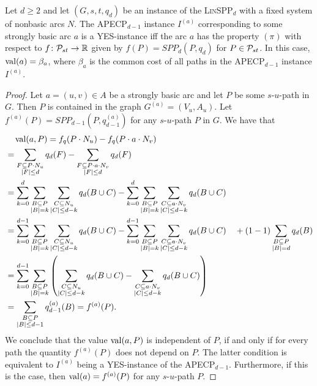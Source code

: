 \begin{lemma}
\label{lemma:corresponding-instance}
Let $d \geq 2$ and let  $(G, s,t, q_d)$ be an instance of the \textsc{Lin}SPP$_d$ with a fixed system of nonbasic arcs  $N$. 
The APECP$_{d-1}$ instance $I^{(a)}$ corresponding to some strongly basic arc $a$ is a \textsc{YES}-instance iff the arc $a$ has the property $(\pi)$ with respect to $f\colon \mathcal{P}_{st}\to\mathbb{R}$ given by $f(P)=SPP_d(P,q_d)$ for $P\in \mathcal{P}_{st}$. In this case, $\operatorname{val}(a) = \beta_a$, where $\beta_a$ is the common cost of all paths in the APECP$_{d-1}$ instance $I^{(a)}$.
\end{lemma}
\begin{proof}
Let $a = (u,v) \in A$ be a strongly basic arc and let $P$ be some $s$-$u$-path in $G$. Then $P$ is  contained in the graph $G^{(a)} = (V_u, A_u)$. 
Let $f^{(a)}(P)=SPP_{d-1}(P,q^{(a)}_{d-1})$ for any $s$-$u$-path $P$ in $G$. We have that
\begin{align*}
    &\quad \operatorname{val}(a, P) = f_q(P \cdot N_u) - f_q(P \cdot a \cdot N_v) \\
    &= \sum_{\substack{F \subseteq P \cdot N_u\\ |F| \leq d}}q_d(F) - \sum_{\substack{F \subseteq P \cdot a \cdot N_v\\ |F| \leq d}}q_d(F)\\
    &= \sum_{k=0}^d \sum_{\substack{B \subseteq P\\ |B| = k}}\sum_{\substack{C \subseteq N_u\\ |C| \leq d - k}}q_d(B \cup C) - \sum_{k=0}^d \sum_{\substack{B \subseteq P\\ |B| = k}}\sum_{\substack{C \subseteq a \cdot N_v\\ |C| \leq d - k}}q_d(B \cup C)\\
    &= \sum_{k=0}^{d-1} \sum_{\substack{B \subseteq P\\ |B| = k}}\sum_{\substack{C \subseteq N_u\\ |C| \leq d - k}}q_d(B \cup C) - \sum_{k=0}^{d-1} \sum_{\substack{B \subseteq P\\ |B| = k}}\sum_{\substack{C \subseteq a \cdot N_v\\ |C| \leq d - k}}q_d(B \cup C) \quad +  (1 - 1)\sum_{\substack{B \subseteq P\\ |B| = d}}q_d(B)\\
     &= \sum_{k=0}^{d-1} \sum_{\substack{B \subseteq P\\ |B| = k}}\left(\sum_{\substack{C \subseteq N_u\\ |C| \leq d - k}}q_d(B \cup C) - \sum_{\substack{C \subseteq a \cdot N_v\\ |C| \leq d - k}}q_d(B \cup C)
     \right)\\
     &= \sum_{\substack{B \subseteq P\\ |B| \leq d-1}}q^{(a)}_{d-1}(B) = f^{(a)}(P).
\end{align*}
We conclude that the value $\operatorname{val}(a, P)$ is independent of $P$, if and only if for every path the quantity $f^{(a)}(P)$ does not depend on $P$. The latter condition is equivalent to  $I^{(a)}$  being a \textsc{YES}-instance of the APECP$_{d-1}$. Furthermore, if this is the case, then $\operatorname{val}(a) = f^{(a)}(P)$ for any $s$-$u$-path $P$.
\end{proof}

